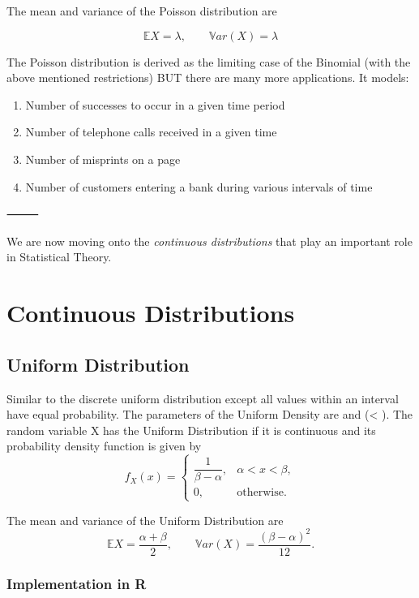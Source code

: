 \documentclass[
  letterpaper,
  DIV=11,
  numbers=noendperiod]{scrreprt}
\begin{document}
The mean and variance of the Poisson distribution are

\[\mathbb{E}X = \lambda, \qquad \mathbb{V}ar(X) = \lambda\]

The Poisson distribution is derived as the limiting case of the Binomial
(with the above mentioned restrictions) BUT there are many more
applications. It models:

\begin{enumerate}
\def\labelenumi{\arabic{enumi}.}
\item
  Number of successes to occur in a given time period
\item
  Number of telephone calls received in a given time
\item
  Number of misprints on a page
\item
  Number of customers entering a bank during various intervals of time
\end{enumerate}

⸻

We are now moving onto the \emph{continuous distributions} that play an
important role in Statistical Theory.

\section{Continuous Distributions}\label{continuous-distributions}

\subsection{Uniform Distribution}\label{uniform-distribution}

Similar to the discrete uniform distribution except all values within an
interval have equal probability. The parameters of the Uniform Density
are \alpha and \beta (\alpha \textless{} \beta). The random variable X
has the Uniform Distribution if it is continuous and its probability
density function is given by \[
f_X(x) =
\begin{cases}
\dfrac{1}{\beta - \alpha}, & \alpha < x < \beta, \\[1ex]
0, & \text{otherwise}.
\end{cases}
\]

The mean and variance of the Uniform Distribution are
\[\mathbb{E}X = \frac{\alpha + \beta}{2},
\qquad
\mathbb{V}ar(X) = \frac{(\beta - \alpha)^2}{12}.
\]

\subsubsection{Implementation in R}\label{implementation-in-r-4}
\end{document}
